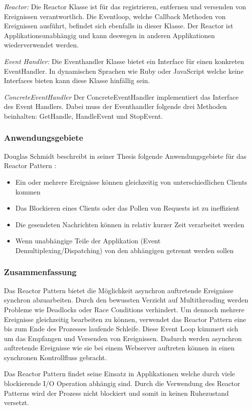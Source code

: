 \cite[p. 2]{Sch95}

\emph{Reactor:}
 Die Reactor Klasse ist für das registrieren, entfernen und versenden von Ereignissen verantwortlich. Die Eventloop, welche Callback Methoden von Ereignissen ausführt, befindet sich ebenfalls in dieser Klasse. Der Reactor ist Applikationsunabhängig und kann deswegen in anderen Applikationen wiederverwendet werden. 

\emph{Event Handler:}
Die Eventhandler Klasse bietet ein Interface für einen konkreten EventHandler. In dynamischen Sprachen wie Ruby oder JavaScript welche keine Interfaces bieten kann diese Klasse hinfällig sein. 

\emph{ConcreteEventHandler}
Der ConcreteEventHandler implementiert das Interface des Event Handlers. Dabei muss der Eventhandler folgende drei Methoden beinhalten: GetHandle, HandleEvent und StopEvent.

\subsubsection{Anwendungsgebiete}

Douglas Schmidt beschreibt in seiner Thesis folgende Anwendungsgebiete für das Reactor Pattern \cite[p. 4]{Sch95}:

\begin{itemize}
  \item Ein oder mehrere Ereignisse können gleichzeitig von unterschiedlichen Clients kommen
  \item Das Blockieren eines Clients oder das Pollen von Requests ist zu ineffizient
  \item Die gesendeten Nachrichten können in relativ kurzer Zeit verarbeitet werden
  \item Wenn unabhängige Teile der Applikation (Event Demultiplexing/Dispatching) von den abhängigen getrennt werden sollen
\end{itemize}

\subsubsection{Zusammenfassung}

Das Reactor Pattern bietet die Möglichkeit asynchron auftretende Ereignisse synchron abzuarbeiten. Durch den bewussten Verzicht auf Multithreading werden Probleme wie Deadlocks oder Race Conditions verhindert. Um dennoch mehrere Ereignisse gleichzeitig bearbeiten zu können, verwendet das Reactor Pattern eine bis zum Ende des Prozesses laufende Schleife. Diese Event Loop kümmert sich um das Empfangen und Versenden von Ereignissen. Dadurch werden asynchron auftretende Ereignisse wie sie bei einem Webserver auftreten können in einen synchronen Kontrollfluss gebracht. 

Das Reactor Pattern findet seine Einsatz in Applikationen welche durch viele blockierende I/O Operation abhängig sind. Durch die Verwendung des Reactor Patterns wird der Prozess nicht blockiert und somit in keinen Ruhezustand versetzt.